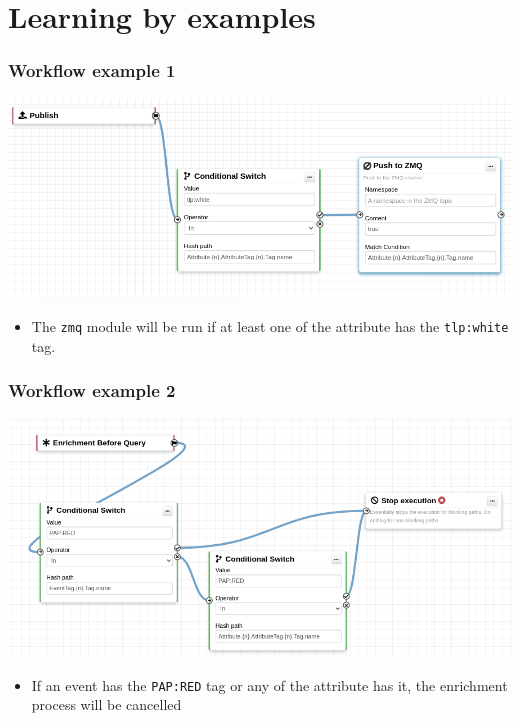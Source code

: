 \section{Learning by examples}
\begin{frame}
    \frametitle{Workflow example 1}
    \begin{center}
        \includegraphics[width=0.95\linewidth]{pictures/example-1.png}
    \end{center}

    \begin{itemize}
        \item The \texttt{zmq} module will be run if at least one of the attribute has the \texttt{tlp:white} tag.
    \end{itemize}
\end{frame}

\begin{frame}
    \frametitle{Workflow example 2}
    \begin{center}
        \includegraphics[width=0.95\linewidth]{pictures/example-2.png}
    \end{center}

    \begin{itemize}
        \item If an event has the \texttt{PAP:RED} tag or any of the attribute has it, the enrichment process will be cancelled
    \end{itemize}
\end{frame}


